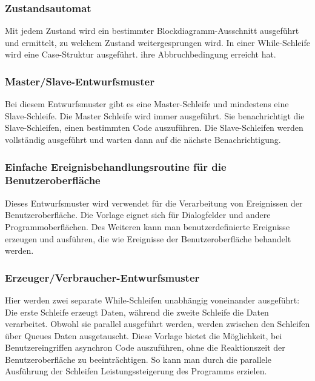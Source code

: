 \subsubsection{Zustandsautomat}%
Mit jedem Zustand wird ein bestimmter Blockdiagramm-Ausschnitt ausgeführt und ermittelt, zu welchem Zustand weitergesprungen wird. 
In einer While-Schleife wird eine Case-Struktur ausgeführt. 
ihre Abbruchbedingung erreicht hat.
	
\subsubsection{Master/Slave-Entwurfsmuster}
Bei diesem Entwurfsmuster gibt es eine Master-Schleife und mindestens eine Slave-Schleife. Die Master Schleife wird immer ausgeführt. 
Sie benachrichtigt die Slave-Schleifen, einen bestimmten Code auszuführen. 
Die Slave-Schleifen werden vollständig ausgeführt und warten dann auf die nächste Benachrichtigung.

\subsubsection{Einfache Ereignisbehandlungsroutine für die Benutzeroberfläche}
Dieses Entwurfsmuster wird verwendet für die Verarbeitung von Ereignissen der Benutzeroberfläche. 
Die Vorlage eignet sich für Dialogfelder und andere Programmoberflächen. 
Des Weiteren kann man benutzerdefinierte Ereignisse erzeugen und ausführen, die wie Ereignisse der Benutzeroberfläche behandelt werden.

\subsubsection{Erzeuger/Verbraucher-Entwurfsmuster} %
Hier werden zwei separate While-Schleifen unabhängig voneinander ausgeführt: Die erste Schleife erzeugt Daten, während die zweite Schleife die Daten verarbeitet. 
Obwohl sie parallel ausgeführt werden, werden zwischen den Schleifen über Queues Daten ausgetauscht.
Diese Vorlage bietet die Möglichkeit, bei Benutzereingriffen asynchron Code auszuführen, ohne die Reaktionszeit der Benutzeroberfläche zu beeinträchtigen. 
So kann man durch die parallele Ausführung der Schleifen Leistungssteigerung des Programms erzielen. 

		
		
